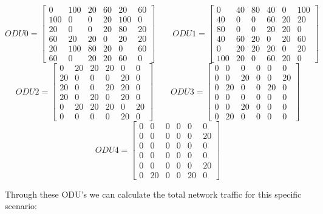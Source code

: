 \[
ODU0=
\begin{bmatrix}
0 & 100 & 20 & 60 & 20 & 60 \\
100 & 0 & 0 & 20 & 100 & 0 \\
20 & 0 & 0 & 20 & 80 & 20 \\
60 & 20 & 20 & 0 & 20 & 20 \\
20 & 100 & 80 & 20 & 0 & 60 \\
60 & 0 & 20 & 20 & 60 & 0
\end{bmatrix}
\qquad ODU1=
\begin{bmatrix}
0 & 40 & 80 & 40 & 0 & 100 \\
40 & 0 & 0 & 60 & 20 & 20 \\
80 & 0 & 0 & 20 & 20 & 0 \\
40 & 60 & 20 & 0 & 20 & 60 \\
0 & 20 & 20 & 20 & 0 & 20 \\
100 & 20 & 0 & 60 & 20 & 0
\end{bmatrix}
\]
\[
ODU2=
\begin{bmatrix}
0 & 20 & 20 & 20 & 0 & 0 \\
20 & 0 & 0 & 0 & 20 & 0 \\
20 & 0 & 0 & 20 & 20 & 0 \\
20 & 0 & 20 & 0 & 20 & 0 \\
0 & 20 & 20 & 20 & 0 & 20 \\
0 & 0 & 0 & 0 & 20 & 0
\end{bmatrix}
\qquad ODU3=
\begin{bmatrix}
0 & 0 & 0 & 0 & 0 & 0 \\
0 & 0 & 20 & 0 & 0 & 20 \\
0 & 20 & 0 & 0 & 20 & 0 \\
0 & 0 & 0 & 0 & 0 & 0 \\
0 & 0 & 20 & 0 & 0 & 0 \\
0 & 20 & 0 & 0 & 0 & 0
\end{bmatrix}
\]
\[
ODU4=
\begin{bmatrix}
0 & 0 & 0 & 0 & 0 & 0 \\
0 & 0 & 0 & 0 & 0 & 20 \\
0 & 0 & 0 & 0 & 0 & 0 \\
0 & 0 & 0 & 0 & 0 & 0 \\
0 & 0 & 0 & 0 & 0 & 20 \\
0 & 20 & 0 & 0 & 20 & 0
\end{bmatrix}
\]

\vspace{17pt}
Through these ODU's we can calculate the total network traffic for this specific scenario:\\

